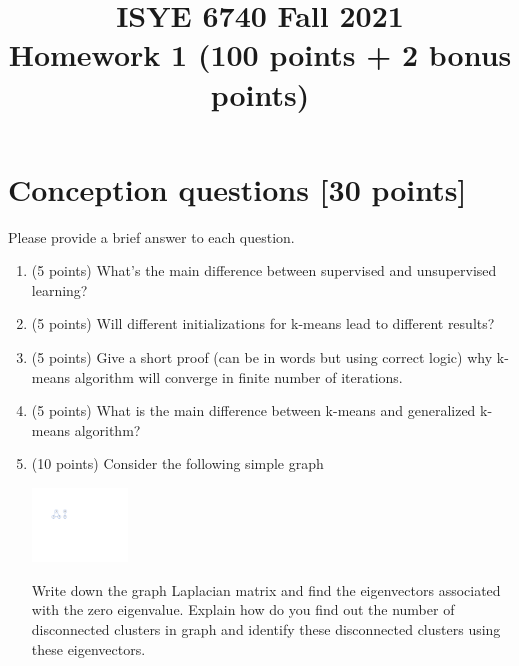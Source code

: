 \documentclass[twoside,10pt]{article}
\begin{document}
\title{ISYE 6740 Fall 2021\\ Homework 1 (100 points + 2 bonus points)}
\date{}

\maketitle

\vspace{-.5in}


\section{Conception questions [30 points]}

Please provide a brief answer to each question.

\begin{enumerate}

\item (5 points) What's the main difference between supervised and unsupervised learning?

\item (5 points) Will different initializations for k-means lead to different results?

\item (5 points) Give a short proof (can be in words but using correct logic) why k-means algorithm will converge in finite number of iterations.

\item (5 points) What is the main difference between k-means and generalized k-means algorithm?



\item (10 points) Consider the following simple graph
\begin{center}
\includegraphics[width = 0.2\textwidth]{plot}
\end{center}

Write down the graph Laplacian matrix and find the eigenvectors associated with the zero eigenvalue. Explain how do you find out the number of disconnected clusters in graph and identify these disconnected clusters using these eigenvectors.



\end{enumerate}
\end{document}
